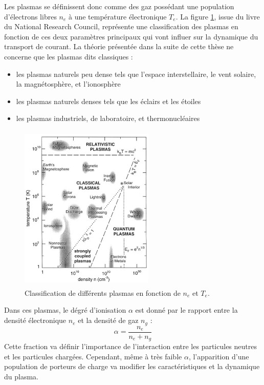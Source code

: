 Les plasmas se définissent donc comme des gaz possédant une population
d'électrons libres $n_e$ à une température électronique $T_e$.
La figure \ref{zoologie}, issue du livre du National Research
Council\cite{national1995Plasma}, représente une classification des plasmas en
fonction de ces deux paramètres principaux qui vont influer sur la dynamique du
transport de courant.
La théorie présentée dans la suite de cette thèse ne concerne que les plasmas
dits classiques :
			\begin{itemize}
			  \item les plasmas naturels peu dense tels que l'espace interstellaire,
			  le vent solaire, la magnétosphère, et l'ionosphère
			  \item les plasmas naturels denses tels que les éclairs et les étoiles
			  \item les plasmas industriels, de laboratoire, et thermonucléaires
			\end{itemize}
			\begin{figure}[htbp]
				\centering
				\includegraphics[height=80mm,width=64mm]{figures/zoologie.png}{\caption{Classification
				de différents plasmas en fonction de $n_e$ et $T_e$.}\label{zoologie}}
			\end{figure}
			
			Dans ces plasmas, le dégré d'ionisation $\alpha$ est donné par le rapport
			entre la densité électronique $n_e$ et la densité de gaz $n_g$ :
			\begin{equation}
				\alpha=\frac{n_e}{n_e+n_g}
			\end{equation}
			Cette fraction va définir l'importance de l'interaction entre les particules 
			neutres et les particules chargées. Cependant, même à très faible $\alpha$,
			l'apparition d'une population de porteurs de charge va modifier les caractéristiques et la
			dynamique du plasma. 
			
